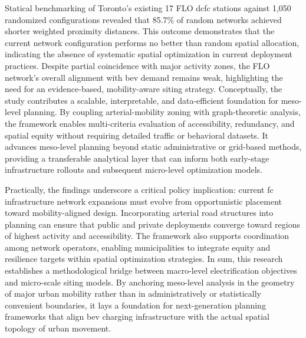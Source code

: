 Statical benchmarking of Toronto’s existing 17 FLO \gls{dcfc} stations against 1,050 randomized configurations revealed that 85.7\% of random networks achieved shorter weighted proximity distances. This outcome demonstrates that the current network configuration performs no better than random spatial allocation, indicating the absence of systematic spatial optimization in current deployment practices. Despite partial coincidence with major activity zones, the FLO network’s overall alignment with \gls{bev} demand remains weak, highlighting the need for an evidence-based, mobility-aware siting strategy.
Conceptually, the study contributes a scalable, interpretable, and data-efficient foundation for meso-level planning. By coupling arterial-mobility zoning with graph-theoretic analysis, the framework enables multi-criteria evaluation of accessibility, redundancy, and spatial equity without requiring detailed traffic or behavioral datasets. It advances meso-level planning beyond static administrative or grid-based methods, providing a transferable analytical layer that can inform both early-stage infrastructure rollouts and subsequent micro-level optimization models.

Practically, the findings underscore a critical policy implication: current \gls{fc} infrastructure network expansions must evolve from opportunistic placement toward mobility-aligned design. Incorporating arterial road structures into planning can ensure that public and private deployments converge toward regions of highest activity and accessibility. The framework also supports coordination among network operators, enabling municipalities to integrate equity and resilience targets within spatial optimization strategies.
In sum, this research establishes a methodological bridge between macro-level electrification objectives and micro-scale siting models. By anchoring meso-level analysis in the geometry of major urban mobility rather than in administratively or statistically convenient boundaries, it lays a foundation for next-generation planning frameworks that align \gls{bev} charging infrastructure with the actual spatial topology of urban movement.




